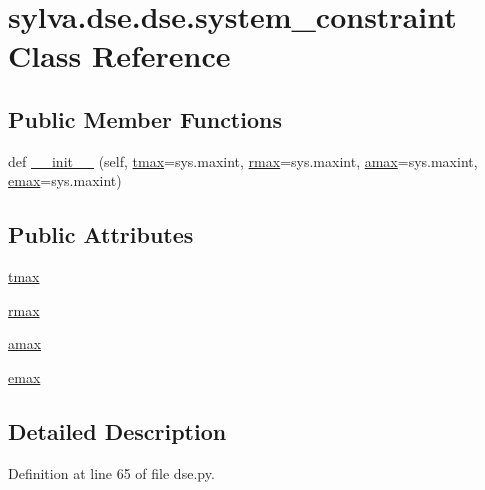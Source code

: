\hypertarget{classsylva_1_1dse_1_1dse_1_1system__constraint}{}\section{sylva.\+dse.\+dse.\+system\+\_\+constraint Class Reference}
\label{classsylva_1_1dse_1_1dse_1_1system__constraint}
\subsection*{Public Member Functions}
\begin{DoxyCompactItemize}
\item 
def \hyperlink{classsylva_1_1dse_1_1dse_1_1system__constraint_a523ed20f50972074b7ac58f0512e6a44}{\+\_\+\+\_\+init\+\_\+\+\_\+} (self, \hyperlink{classsylva_1_1dse_1_1dse_1_1system__constraint_a6c8109105f6fa2eab4eacf3f1bd2591c}{tmax}=sys.\+maxint, \hyperlink{classsylva_1_1dse_1_1dse_1_1system__constraint_a38b69b0cf3afa28bc94e76d7108434cd}{rmax}=sys.\+maxint, \hyperlink{classsylva_1_1dse_1_1dse_1_1system__constraint_a37c94dd85a091ca20492e0fdffde4d52}{amax}=sys.\+maxint, \hyperlink{classsylva_1_1dse_1_1dse_1_1system__constraint_a641790b89ace02df93adf6785d5fe372}{emax}=sys.\+maxint)
\end{DoxyCompactItemize}
\subsection*{Public Attributes}
\begin{DoxyCompactItemize}
\item 
\hyperlink{classsylva_1_1dse_1_1dse_1_1system__constraint_a6c8109105f6fa2eab4eacf3f1bd2591c}{tmax}
\item 
\hyperlink{classsylva_1_1dse_1_1dse_1_1system__constraint_a38b69b0cf3afa28bc94e76d7108434cd}{rmax}
\item 
\hyperlink{classsylva_1_1dse_1_1dse_1_1system__constraint_a37c94dd85a091ca20492e0fdffde4d52}{amax}
\item 
\hyperlink{classsylva_1_1dse_1_1dse_1_1system__constraint_a641790b89ace02df93adf6785d5fe372}{emax}
\end{DoxyCompactItemize}


\subsection{Detailed Description}


Definition at line 65 of file dse.\+py.



